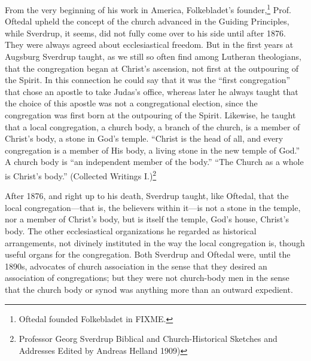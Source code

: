 From the very beginning of his work in America, Folkebladet’s founder,\footnote{Oftedal founded Folkebladet in FIXME.} Prof. Oftedal upheld the concept of the church advanced in the Guiding Principles, while Sverdrup, it seems, did not fully come over to his side until after 1876. They were always agreed about ecclesiastical freedom. But in the first years at Augsburg Sverdrup taught, as we still so often find among Lutheran theologians, that the congregation began at Christ’s ascension, not first at the outpouring of the Spirit. In this connection he could say that it was the “first congregation” that chose an apostle to take Judas’s office, whereas later he always taught that the choice of this apostle was not a congregational election, since the congregation was first born at the outpouring of the Spirit. Likewise, he taught that a local congregation, a church body, a branch of the church, is a member of Christ’s body, a stone in God’s temple. “Christ is the head of all, and every congregation is a member of His body, a living stone in the new temple of God.” A church body is “an independent member of the body.” “The Church as a whole is Christ’s body.” (Collected Writings I.)\footnote{Professor Georg Sverdrup Biblical and Church-Historical Sketches and Addresses Edited by Andreas Helland 1909)}




After 1876, and right up to his death, Sverdrup taught, like Oftedal, that the local congregation—that is, the believers within it—is not a stone in the temple, nor a member of Christ’s body, but is itself the temple, God’s house, Christ’s body. The other ecclesiastical organizations he regarded as historical arrangements, not divinely instituted in the way the local congregation is, though useful organs for the congregation. Both Sverdrup and Oftedal were, until the 1890s, advocates of church association in the sense that they desired an association of congregations; but they were not church-body men in the sense that the church body or synod was anything more than an outward expedient.

